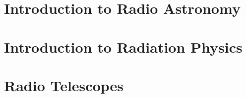 \documentclass{article}
\begin{document}
\thispagestyle{empty}

\titleBC
\tableofcontents
\clearpage

\section{Introduction to Radio Astronomy}

\newpage

\section{Introduction to Radiation Physics}

\newpage

\section{Radio Telescopes}
\end{document}
